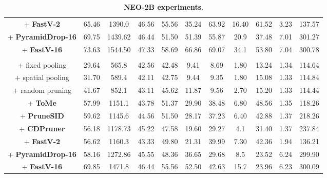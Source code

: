 \documentclass[11pt]{article}
\begin{document}
\begin{table}[ht]
{\begin{tabular}{c|cccc|cccc|cc}
        \hline
        + \textbf{FastV-2} & 65.46 & 1390.0 & 46.56 & 55.56 & 35.24 & 63.92 & 16.40 & 61.52 & 3.23 & 137.57 \\
        + \textbf{PyramidDrop-16} & 69.75 & 1439.62 & 46.44 & 51.50 & 51.39 & 55.87  & 20.9 & 37.48 & 7.01 & 301.27 \\
        + \textbf{FastV-16} & 73.63 & 1544.50 & 47.33 & 58.69 & 66.86 & 69.07 & 34.1 & 53.80 & 7.04 & 300.78 \\
       \rowcolor{green!10}\multicolumn{11}{c}{8x compression} \\
        + fixed pooling & 29.64 & 565.8 & 42.56 & 42.48 & 9.41 & 8.69 & 1.80 & 13.24 & 1.34 & 114.64 \\
        + spatial pooling & 31.70 & 589.4 & 42.11 & 42.75 & 9.44 & 9.35 & 1.80 & 15.08 & 1.33 & 114.84 \\
        + random pruning & 41.67 & 852.1 & 43.11 & 45.62 & 11.87 & 9.56 & 2.70 & 15.20 & 1.33 & 114.44 \\
        \hline
        + \textbf{ToMe} & 57.99 & 1151.1 & 43.78 & 51.37 & 29.90 & 38.48 & 6.80 & 48.56 & 1.35 & 118.26 \\
        + \textbf{PruneSID} & 59.62 & 1145.6 & 44.56 & 51.50 & 28.17 & 37.23 & 6.40 & 42.88 & 1.37 & 218.26 \\
        + \textbf{CDPruner} & 56.18 & 1178.73 & 45.22 & 47.58 & 19.60 & 29.27 & 4.1 & 31.40 & 1.37 & 237.84 \\
        \hline
        + \textbf{FastV-2} & 56.62 & 1160.3 & 43.33 & 49.80 & 21.31 & 39.99 & 7.30 & 42.36 & 1.94 & 136.21 \\
        + \textbf{PyramidDrop-16} & 58.16 & 1272.86 & 45.55 & 48.36 & 36.65 & 29.68 & 8.5 & 23.52 & 6.24 & 299.90 \\
        + \textbf{FastV-16} & 69.85 & 1471.8 & 46.44 & 55.56 & 52.50 & 42.63 & 15.7 & 23.96 & 6.23 & 300.09 \\
        \bottomrule
    \end{tabular}}
    \caption{\textbf{NEO-2B experiments}.}
    \label{tab:results-2B}
\end{table}
\end{document}

